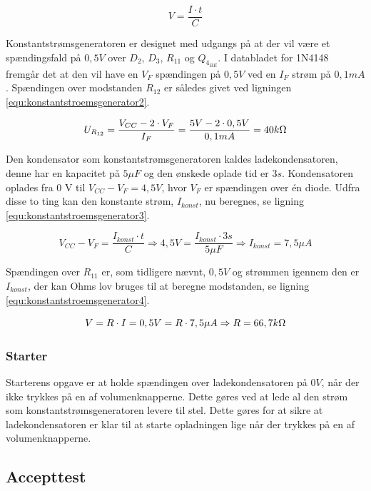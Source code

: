 \begin{equation}
\label{equ:konstantstroemsgenerator1}
V = \frac{I \cdot t}{C}
\end{equation}

Konstantstrømsgeneratoren er designet med udgangs på at der vil være et spændingsfald på $0,5 V$ over $D_2$, $D_3$, $R_{11}$ og $Q_{4_{BE}}$. I databladet for 1N4148 fremgår det at den vil have en $V_F$ spændingen på $0,5 V$ ved en $I_F$ strøm på $0,1 mA$. Spændingen over modstanden $R_{12}$ er således givet ved ligningen \ref{equ:konstantstroemsgenerator2}.

\begin{equation}
\label{equ:konstantstroemsgenerator2}
U_{R_{12}} = \frac{V_{CC} - 2 \cdot V_F}{I_F} = \frac{5V - 2 \cdot 0,5 V}{0,1 mA} = 40 k\ohm
\end{equation}

Den kondensator som konstantstrømsgeneratoren kaldes ladekondensatoren, denne har en kapacitet på $5 \mu F$ og den ønskede oplade tid er $3 s$. Kondensatoren oplades fra 0 V til $V_{CC} - V_F = 4,5 V$, hvor $V_F$ er spændingen over én diode. Udfra disse to ting kan den konstante strøm, $I_{konst}$, nu beregnes, se ligning \ref{equ:konstantstroemsgenerator3}.

\begin{equation}
\label{equ:konstantstroemsgenerator3}
V_{CC} - V_F = \frac{I_{konst} \cdot t}{C} \Rightarrow 4,5 V = \frac{I_{konst} \cdot 3 s}{5 \mu F} \Rightarrow I_{konst} = 7,5 \mu A
\end{equation}

Spændingen over $R_{11}$ er, som tidligere nævnt, $0,5 V$ og strømmen igennem den er $I_{konst}$, der kan Ohms lov bruges til at beregne modstanden, se ligning \ref{equ:konstantstroemsgenerator4}.

\begin{equation}
\label{equ:konstantstroemsgenerator4}
V = R \cdot I = 0,5 V = R \cdot 7,5 \mu A \Rightarrow R = 66,7 k\ohm
\end{equation}

\subsubsection{Starter}
\label{volumenkontrol-simulering-starter}

Starterens opgave er at holde spændingen over ladekondensatoren på $0 V$, når der ikke trykkes på en af volumenknapperne. Dette gøres ved at lede al den strøm som konstantstrømsgeneratoren levere til stel. Dette gøres for at sikre at ladekondensatoren er klar til at starte opladningen lige når der trykkes på en af volumenknapperne.

\subsection{Accepttest}
\label{volumenkontrol-accepttest}